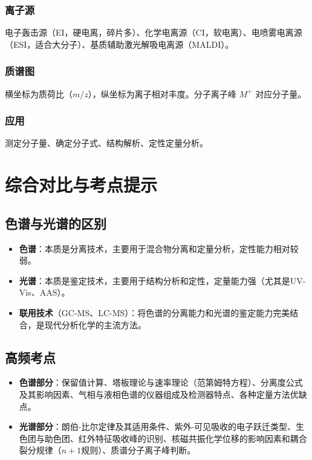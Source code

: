 \documentclass[11pt,a4paper]{article}
\begin{document}
\subsubsection{离子源}
电子轰击源（EI，硬电离，碎片多）、化学电离源（CI，软电离）、电喷雾电离源（ESI，适合大分子）、基质辅助激光解吸电离源（MALDI）。

\subsubsection{质谱图}
横坐标为质荷比（\( m/z \)），纵坐标为离子相对丰度。分子离子峰 \( M^+ \) 对应分子量。

\subsubsection{应用}
测定分子量、确定分子式、结构解析、定性定量分析。

\newpage
\section{综合对比与考点提示}

\subsection{色谱与光谱的区别}
\begin{itemize}
    \item \textbf{色谱}：本质是分离技术，主要用于混合物分离和定量分析，定性能力相对较弱。
    \item \textbf{光谱}：本质是鉴定技术，主要用于结构分析和定性，定量能力强（尤其是UV-Vis、AAS）。
    \item \textbf{联用技术}（GC-MS、LC-MS）：将色谱的分离能力和光谱的鉴定能力完美结合，是现代分析化学的主流方法。
\end{itemize}

\subsection{高频考点}
\begin{itemize}
    \item \textbf{色谱部分}：保留值计算、塔板理论与速率理论（范第姆特方程）、分离度公式及其影响因素、气相与液相色谱的仪器组成及检测器特点、各种定量方法优缺点。
    \item \textbf{光谱部分}：朗伯-比尔定律及其适用条件、紫外-可见吸收的电子跃迁类型、生色团与助色团、红外特征吸收峰的识别、核磁共振化学位移的影响因素和耦合裂分规律（\( n+1 \)规则）、质谱分子离子峰判断。
\end{itemize}
\end{document}

